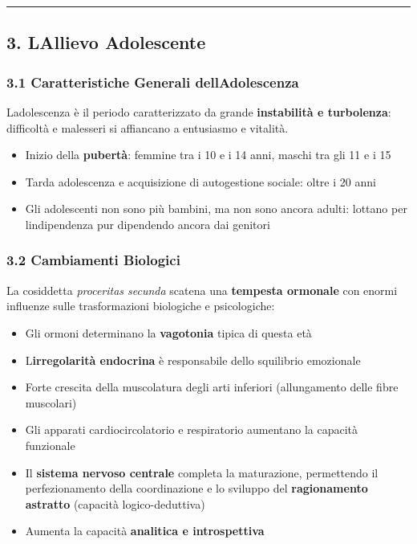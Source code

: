 \documentclass[a4paper,11pt]{article}
\providecommand{\tightlist}{%
  \setlength{\itemsep}{0pt}\setlength{\parskip}{0pt}}
\begin{document}
\begin{center}\rule{0.5\linewidth}{0.5pt}\end{center}

\subsection{3. L\textquotesingle Allievo
      Adolescente}\label{lallievo-adolescente}

\subsubsection{3.1 Caratteristiche Generali
      dell\textquotesingle Adolescenza}\label{caratteristiche-generali-delladolescenza}

L\textquotesingle adolescenza è il periodo caratterizzato da grande
\textbf{instabilità e turbolenza}: difficoltà e malesseri si affiancano
a entusiasmo e vitalità.

\begin{itemize}
      \tightlist
      \item
            Inizio della \textbf{pubertà}: femmine tra i 10 e i 14 anni, maschi
            tra gli 11 e i 15
      \item
            Tarda adolescenza e acquisizione di autogestione sociale: oltre i 20
            anni
      \item
            Gli adolescenti non sono più bambini, ma non sono ancora adulti:
            lottano per l\textquotesingle indipendenza pur dipendendo ancora dai
            genitori
\end{itemize}

\subsubsection{3.2 Cambiamenti Biologici}\label{cambiamenti-biologici}

La cosiddetta \emph{proceritas secunda} scatena una \textbf{tempesta
      ormonale} con enormi influenze sulle trasformazioni biologiche e
psicologiche:

\begin{itemize}
      \tightlist
      \item
            Gli ormoni determinano la \textbf{vagotonia} tipica di questa età
      \item
            L\textquotesingle{}\textbf{irregolarità endocrina} è responsabile
            dello squilibrio emozionale
      \item
            Forte crescita della muscolatura degli arti inferiori (allungamento
            delle fibre muscolari)
      \item
            Gli apparati cardiocircolatorio e respiratorio aumentano la capacità
            funzionale
      \item
            Il \textbf{sistema nervoso centrale} completa la maturazione,
            permettendo il perfezionamento della coordinazione e lo sviluppo del
            \textbf{ragionamento astratto} (capacità logico-deduttiva)
      \item
            Aumenta la capacità \textbf{analitica e introspettiva}
\end{itemize}
\end{document}
